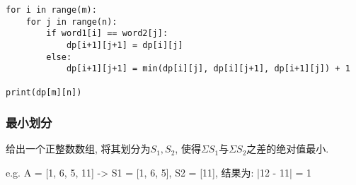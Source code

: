 \documentclass[../main]{subfiles}
\begin{document}
\begin{sloppy}
\begin{lstlisting}[style = Python]
for i in range(m):
    for j in range(n):
        if word1[i] == word2[j]:
            dp[i+1][j+1] = dp[i][j]
        else:
            dp[i+1][j+1] = min(dp[i][j], dp[i][j+1], dp[i+1][j]) + 1

print(dp[m][n])
\end{lstlisting}

\subsubsection{最小划分}

给出一个正整数数组, 将其划分为$S_1, S_2$, 使得$\Sigma S_1$与$\Sigma S_2$之差的绝对值最小.

e.g. A = [1, 6, 5, 11] -> S1 = [1, 6, 5], S2 = [11], 结果为: |12 - 11| = 1




\end{sloppy}
\end{document}
